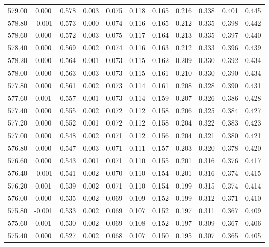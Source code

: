 \begin{longtable}{cccccccccc}
    579.00 &  0.000 &  0.578 &  0.003 &  0.075 &  0.118 &  0.165 &  0.216 &  0.338 &  0.401 &  0.445 \\
    578.80 & -0.001 &  0.573 &  0.000 &  0.074 &  0.116 &  0.165 &  0.212 &  0.335 &  0.398 &  0.442 \\
    578.60 &  0.000 &  0.572 &  0.003 &  0.075 &  0.117 &  0.164 &  0.213 &  0.335 &  0.397 &  0.440 \\
    578.40 &  0.000 &  0.569 &  0.002 &  0.074 &  0.116 &  0.163 &  0.212 &  0.333 &  0.396 &  0.439 \\
    578.20 &  0.000 &  0.564 &  0.001 &  0.073 &  0.115 &  0.162 &  0.209 &  0.330 &  0.392 &  0.434 \\
    578.00 &  0.000 &  0.563 &  0.003 &  0.073 &  0.115 &  0.161 &  0.210 &  0.330 &  0.390 &  0.434 \\
    577.80 &  0.000 &  0.561 &  0.002 &  0.073 &  0.114 &  0.161 &  0.208 &  0.328 &  0.390 &  0.431 \\
    577.60 &  0.001 &  0.557 &  0.001 &  0.073 &  0.114 &  0.159 &  0.207 &  0.326 &  0.386 &  0.428 \\
    577.40 &  0.000 &  0.555 &  0.002 &  0.072 &  0.112 &  0.158 &  0.206 &  0.325 &  0.384 &  0.427 \\
    577.20 &  0.000 &  0.552 &  0.001 &  0.072 &  0.112 &  0.158 &  0.204 &  0.322 &  0.383 &  0.423 \\
    577.00 &  0.000 &  0.548 &  0.002 &  0.071 &  0.112 &  0.156 &  0.204 &  0.321 &  0.380 &  0.421 \\
    576.80 &  0.000 &  0.547 &  0.003 &  0.071 &  0.111 &  0.157 &  0.203 &  0.320 &  0.378 &  0.420 \\
    576.60 &  0.000 &  0.543 &  0.001 &  0.071 &  0.110 &  0.155 &  0.201 &  0.316 &  0.376 &  0.417 \\
    576.40 & -0.001 &  0.541 &  0.002 &  0.070 &  0.110 &  0.154 &  0.201 &  0.316 &  0.374 &  0.415 \\
    576.20 &  0.001 &  0.539 &  0.002 &  0.071 &  0.110 &  0.154 &  0.199 &  0.315 &  0.374 &  0.414 \\
    576.00 &  0.000 &  0.535 &  0.002 &  0.069 &  0.109 &  0.152 &  0.199 &  0.312 &  0.371 &  0.410 \\
    575.80 & -0.001 &  0.533 &  0.002 &  0.069 &  0.107 &  0.152 &  0.197 &  0.311 &  0.367 &  0.409 \\
    575.60 &  0.001 &  0.530 &  0.002 &  0.069 &  0.108 &  0.152 &  0.197 &  0.309 &  0.367 &  0.406 \\
    575.40 &  0.000 &  0.527 &  0.002 &  0.068 &  0.107 &  0.150 &  0.195 &  0.307 &  0.365 &  0.405 \\

\end{longtable}
